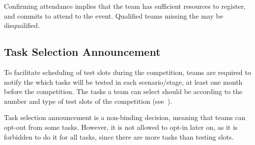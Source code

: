 Confirming attendance implies that the team has sufficient resources to register, and commits to attend to the event.
Qualified teams missing the  may be disqualified.

\subsection{Task Selection Announcement}
\label{rule:task-selection-announcement}
To facilitate scheduling of test slots during the competition, teams are required to notify the  which tasks will be tested in each scenario/stage, at least one month before the competition. The tasks a team can select should be according to the number and type of test slots of the competition (see~).

Task selection announcement is a non-binding decision, meaning that teams can opt-out from some tasks. However, it is not allowed to opt-in later on, as it is forbidden to do it for all tasks, since there are more tasks than testing slots.

